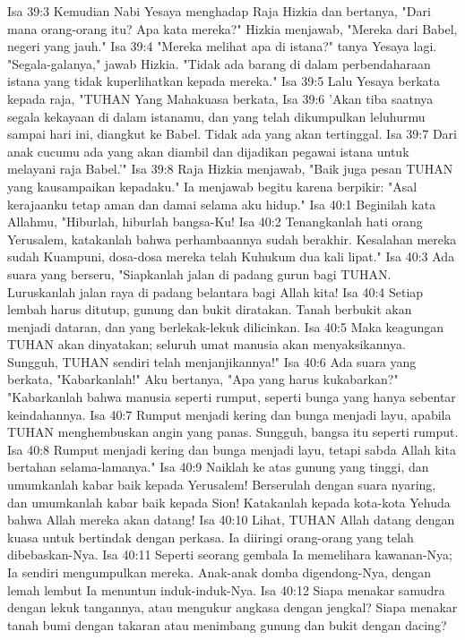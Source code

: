 Isa 39:3  Kemudian Nabi Yesaya menghadap Raja Hizkia dan bertanya, "Dari mana orang-orang itu? Apa kata mereka?" Hizkia menjawab, "Mereka dari Babel, negeri yang jauh."
Isa 39:4  "Mereka melihat apa di istana?" tanya Yesaya lagi. "Segala-galanya," jawab Hizkia. "Tidak ada barang di dalam perbendaharaan istana yang tidak kuperlihatkan kepada mereka."
Isa 39:5  Lalu Yesaya berkata kepada raja, "TUHAN Yang Mahakuasa berkata,
Isa 39:6  'Akan tiba saatnya segala kekayaan di dalam istanamu, dan yang telah dikumpulkan leluhurmu sampai hari ini, diangkut ke Babel. Tidak ada yang akan tertinggal.
Isa 39:7  Dari anak cucumu ada yang akan diambil dan dijadikan pegawai istana untuk melayani raja Babel.'"
Isa 39:8  Raja Hizkia menjawab, "Baik juga pesan TUHAN yang kausampaikan kepadaku." Ia menjawab begitu karena berpikir: "Asal kerajaanku tetap aman dan damai selama aku hidup."
Isa 40:1  Beginilah kata Allahmu, "Hiburlah, hiburlah bangsa-Ku!
Isa 40:2  Tenangkanlah hati orang Yerusalem, katakanlah bahwa perhambaannya sudah berakhir. Kesalahan mereka sudah Kuampuni, dosa-dosa mereka telah Kuhukum dua kali lipat."
Isa 40:3  Ada suara yang berseru, "Siapkanlah jalan di padang gurun bagi TUHAN. Luruskanlah jalan raya di padang belantara bagi Allah kita!
Isa 40:4  Setiap lembah harus ditutup, gunung dan bukit diratakan. Tanah berbukit akan menjadi dataran, dan yang berlekak-lekuk dilicinkan.
Isa 40:5  Maka keagungan TUHAN akan dinyatakan; seluruh umat manusia akan menyaksikannya. Sungguh, TUHAN sendiri telah menjanjikannya!"
Isa 40:6  Ada suara yang berkata, "Kabarkanlah!" Aku bertanya, "Apa yang harus kukabarkan?" "Kabarkanlah bahwa manusia seperti rumput, seperti bunga yang hanya sebentar keindahannya.
Isa 40:7  Rumput menjadi kering dan bunga menjadi layu, apabila TUHAN menghembuskan angin yang panas. Sungguh, bangsa itu seperti rumput.
Isa 40:8  Rumput menjadi kering dan bunga menjadi layu, tetapi sabda Allah kita bertahan selama-lamanya."
Isa 40:9  Naiklah ke atas gunung yang tinggi, dan umumkanlah kabar baik kepada Yerusalem! Berserulah dengan suara nyaring, dan umumkanlah kabar baik kepada Sion! Katakanlah kepada kota-kota Yehuda bahwa Allah mereka akan datang!
Isa 40:10  Lihat, TUHAN Allah datang dengan kuasa untuk bertindak dengan perkasa. Ia diiringi orang-orang yang telah dibebaskan-Nya.
Isa 40:11  Seperti seorang gembala Ia memelihara kawanan-Nya; Ia sendiri mengumpulkan mereka. Anak-anak domba digendong-Nya, dengan lemah lembut Ia menuntun induk-induk-Nya.
Isa 40:12  Siapa menakar samudra dengan lekuk tangannya, atau mengukur angkasa dengan jengkal? Siapa menakar tanah bumi dengan takaran atau menimbang gunung dan bukit dengan dacing?
